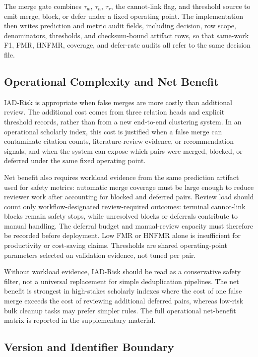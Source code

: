 \documentclass[preprint,12pt]{elsarticle}
\begin{document}
The merge gate combines $\tau_w$, $\tau_n$, $\tau_r$, the cannot-link flag, and threshold source to emit merge, block, or defer under a fixed operating point. The implementation then writes prediction and metric audit fields, including decision, row scope, denominators, thresholds, and checksum-bound artifact rows, so that same-work F1, FMR, HNFMR, coverage, and defer-rate audits all refer to the same decision file.

\subsection{Operational Complexity and Net Benefit}

IAD-Risk is appropriate when false merges are more costly than additional review. The additional cost comes from three relation heads and explicit threshold records, rather than from a new end-to-end clustering system. In an operational scholarly index, this cost is justified when a false merge can contaminate citation counts, literature-review evidence, or recommendation signals, and when the system can expose which pairs were merged, blocked, or deferred under the same fixed operating point.

Net benefit also requires workload evidence from the same prediction artifact used for safety metrics: automatic merge coverage must be large enough to reduce reviewer work after accounting for blocked and deferred pairs. Review load should count only workflow-designated review-required outcomes: terminal cannot-link blocks remain safety stops, while unresolved blocks or deferrals contribute to manual handling. The deferral budget and manual-review capacity must therefore be recorded before deployment. Low FMR or HNFMR alone is insufficient for productivity or cost-saving claims. Thresholds are shared operating-point parameters selected on validation evidence, not tuned per pair.

Without workload evidence, IAD-Risk should be read as a conservative safety filter, not a universal replacement for simple deduplication pipelines. The net benefit is strongest in high-stakes scholarly indexes where the cost of one false merge exceeds the cost of reviewing additional deferred pairs, whereas low-risk bulk cleanup tasks may prefer simpler rules. The full operational net-benefit matrix is reported in the supplementary material.

\subsection{Version and Identifier Boundary}
\end{document}
